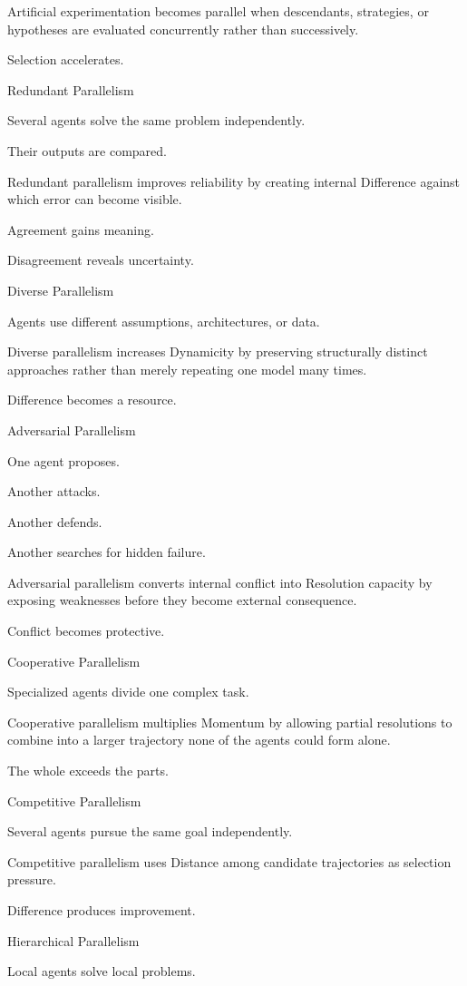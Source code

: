 Artificial experimentation becomes parallel when descendants, strategies, or hypotheses are evaluated concurrently rather than successively.

Selection accelerates.

Redundant Parallelism

Several agents solve the same problem independently.

Their outputs are compared.

Redundant parallelism improves reliability by creating internal Difference against which error can become visible.

Agreement gains meaning.

Disagreement reveals uncertainty.

Diverse Parallelism

Agents use different assumptions, architectures, or data.

Diverse parallelism increases Dynamicity by preserving structurally distinct approaches rather than merely repeating one model many times.

Difference becomes a resource.

Adversarial Parallelism

One agent proposes.

Another attacks.

Another defends.

Another searches for hidden failure.

Adversarial parallelism converts internal conflict into Resolution capacity by exposing weaknesses before they become external consequence.

Conflict becomes protective.

Cooperative Parallelism

Specialized agents divide one complex task.

Cooperative parallelism multiplies Momentum by allowing partial resolutions to combine into a larger trajectory none of the agents could form alone.

The whole exceeds the parts.

Competitive Parallelism

Several agents pursue the same goal independently.

Competitive parallelism uses Distance among candidate trajectories as selection pressure.

Difference produces improvement.

Hierarchical Parallelism

Local agents solve local problems.

